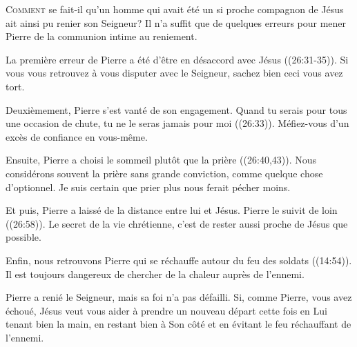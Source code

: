 
\lettrine{C}{omment} se fait-il qu'un homme qui avait été un si proche
 compagnon de Jésus ait ainsi pu renier son Seigneur?
 Il n'a suffit que de quelques erreurs pour mener Pierre de la communion intime au reniement. 

La première erreur de Pierre a été d'être en désaccord avec Jésus
 ((26:31-35)).
 Si vous vous retrouvez à vous disputer avec le Seigneur,
 sachez bien ceci\frcolon{} vous avez tort. 


Deuxièmement, Pierre s'est vanté de son engagement.
 \Og Quand tu serais pour tous une occasion de chute,
 tu ne le seras jamais pour moi \Fg{} ((26:33)).
 Méfiez-vous d'un excès de confiance en vous-même. 

Ensuite, Pierre a choisi le sommeil plutôt que la prière
 ((26:40,43)).
 Nous considérons souvent la prière sans grande conviction,
 comme quelque chose d'optionnel.
 Je suis certain que prier plus nous ferait pécher moins. 

Et puis, Pierre a laissé de la distance entre lui et Jésus.
 \Og Pierre le suivit de loin \Fg{} ((26:58)).
 Le secret de la vie chrétienne, 
 c'est de rester aussi proche de Jésus que possible. 

Enfin, nous retrouvons Pierre qui se réchauffe
 autour du feu des soldats ((14:54)).
 Il est toujours dangereux de chercher de la chaleur auprès de l'ennemi. 

Pierre a renié le Seigneur, mais sa foi n'a pas défailli.
 Si, comme Pierre, vous avez échoué, Jésus veut vous aider
 à prendre un nouveau départ \ocadr cette fois en Lui tenant bien la main,
 en restant bien à Son côté et en évitant le feu réchauffant de l'ennemi. 

\dvrule



